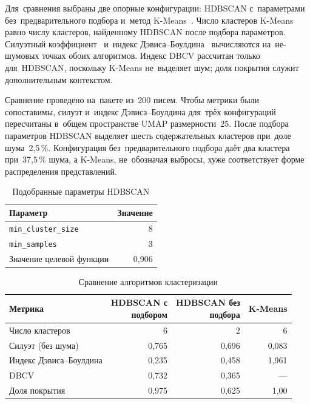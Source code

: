 Для~сравнения выбраны две опорные конфигурации: HDBSCAN с~параметрами
без~предварительного подбора и~метод K-Means~\cite{MacQueen1967KMeans}.
Число кластеров K-Means равно числу кластеров, найденному HDBSCAN после подбора
параметров. Силуэтный коэффициент~\cite{Rousseeuw1987Silhouette} и~индекс
Дэвиса--Боулдина~\cite{Davies1979DBI} вычисляются на~не-шумовых точках обоих
алгоритмов. Индекс DBCV рассчитан только для~HDBSCAN, поскольку K-Means
не~выделяет шум; доля покрытия служит дополнительным контекстом.

Сравнение проведено на~пакете из~200 писем. Чтобы метрики были сопоставимы,
силуэт и~индекс Дэвиса--Боулдина для~трёх конфигураций пересчитаны в~общем
пространстве UMAP размерности~25. После подбора параметров HDBSCAN выделяет
шесть содержательных кластеров при~доле шума~2{,}5\,\%. Конфигурация
без~предварительного подбора даёт два кластера при~37{,}5\,\% шума, а K-Means,
не~обозначая выбросы, хуже соответствует форме распределения представлений.

\begin{table}[htbp]
    \centering
    \caption{Подобранные параметры HDBSCAN}\label{tab:ch3/tuning-best}
    \begin{tabular}{@{}lr@{}}
        \toprule
        Параметр & Значение \\
        \midrule
        \texttt{min\_cluster\_size} & 8 \\
        \texttt{min\_samples}       & 3 \\
        Значение целевой функции     & 0{,}906 \\
        \bottomrule
    \end{tabular}
\end{table}
\FloatBarrier

\begin{table}[htbp]
    \centering
    \caption{Сравнение алгоритмов кластеризации}\label{tab:ch3/cluster-compare}
    \begin{tabular}{@{}lrrr@{}}
        \toprule
        Метрика & \makecell{HDBSCAN с \\ подбором} &
        \makecell{HDBSCAN без \\ подбора} & K-Means \\
        \midrule
        Число кластеров            & 6 & 2 & 6 \\
        Силуэт (без шума)          & 0{,}765 & 0{,}696 & 0{,}083 \\
        Индекс Дэвиса--Боулдина    & 0{,}235 & 0{,}458 & 1{,}961 \\
        DBCV                       & 0{,}732 & 0{,}365 & --- \\
        Доля покрытия              & 0{,}975 & 0{,}625 & 1{,}00 \\
        \bottomrule
    \end{tabular}
\end{table}
\FloatBarrier

